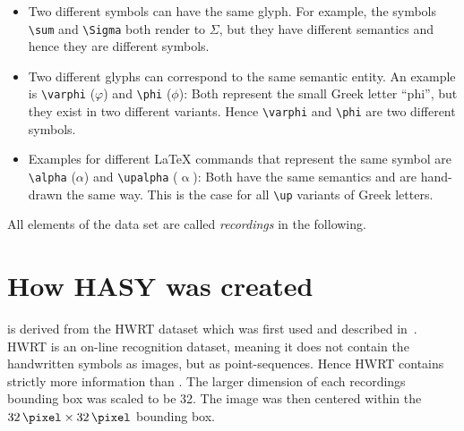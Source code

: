 \begin{itemize}
    \item Two different symbols can have the same glyph. For example, the symbols
\verb+\sum+ and \verb+\Sigma+ both render to $\Sigma$, but they have different
semantics and hence they are different symbols.
    \item Two different glyphs can correspond to the same semantic entity. An example is
\verb+\varphi+ ($\varphi$) and \verb+\phi+ ($\phi$): Both represent the small
Greek letter \enquote{phi}, but they exist in two different variants. Hence
\verb+\varphi+ and \verb+\phi+ are two different symbols.
    \item Examples for different \LaTeX{} commands that represent the same symbol are
          \verb+\alpha+ ($\alpha$) and \verb+\upalpha+ ($\upalpha$): Both have the same
semantics and are hand-drawn the same way. This is the case for all \verb+\up+
variants of Greek letters.
\end{itemize}

All elements of the data set are called \textit{recordings} in the following.


\section{How HASY was created}
\dbName{} is derived from the HWRT dataset which was first used and described
in~\cite{Thoma:2014}. HWRT is an on-line recognition dataset, meaning it does
not contain the handwritten symbols as images, but as point-sequences. Hence
HWRT contains strictly more information than \dbName. The larger dimension
of each recordings bounding box was scaled to be \SI{32}{\pixel}. The image
was then centered within the $\SI{32}{\pixel} \times \SI{32}{\pixel}$ bounding
box.


